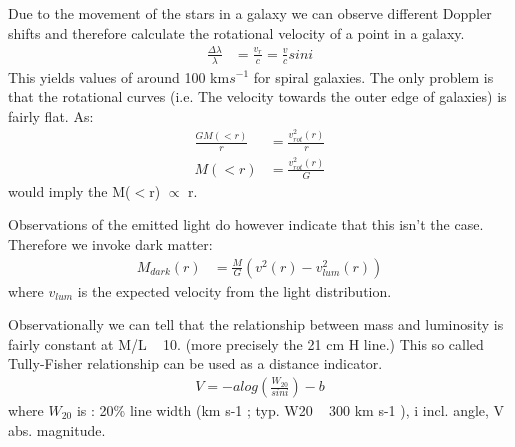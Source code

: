 \documentclass[11pt,a4paper]{article}
\begin{document}
Due to the movement of the stars in a galaxy we can observe different Doppler shifts and therefore calculate the rotational velocity of a point in a galaxy.
\begin{align*}
\frac {\Delta \lambda}{\lambda} &= \frac {v_r} c = \frac v c sin i
\end{align*}
This yields values of around 100 km$s^{-1}$ for spiral galaxies.
The only problem is that the rotational curves (i.e. The velocity towards the outer edge of galaxies) is fairly flat.
As:
\begin{align*}
    \frac {GM (< r) } r &= \frac {v^2_{rot}(r)} r \\  
    M (< r) &= \frac {v^2_{rot}(r)} G
\end{align*}
would imply the M($<$r) $\propto$ r.

Observations of the emitted light do however indicate that this isn't the case. 
Therefore we invoke dark matter: 
\begin{align*}
    M_{dark}(r) &= \frac M G (v^2 (r) - v_{lum}^2(r)) 
\end{align*}
where $v_{lum}$ is the expected velocity from the light distribution.

Observationally we can tell that the relationship between mass and luminosity is fairly constant at M/L ~ 10. (more precisely the 21 cm H line.)
This so called Tully-Fisher relationship can be used as a distance indicator. 
\begin{align*}
    V = - a log \left ( \frac {W_{20}}{sin i} \right ) - b
\end{align*}
where $W_{20}$ is : 20\% line width (km s-1
; typ. W20 ~ 300 km s-1
), i incl. angle, V abs. magnitude.
\end{document}
